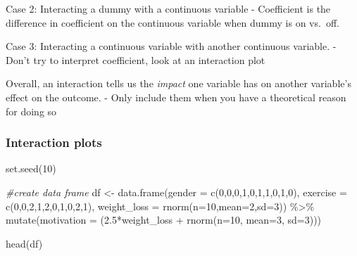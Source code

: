 \documentclass[
]{article}
\newenvironment{Shaded}{\begin{snugshade}}{\end{snugshade}}
\newcommand{\AttributeTok}[1]{\textcolor[rgb]{0.77,0.63,0.00}{#1}}
\newcommand{\CommentTok}[1]{\textcolor[rgb]{0.56,0.35,0.01}{\textit{#1}}}
\newcommand{\DecValTok}[1]{\textcolor[rgb]{0.00,0.00,0.81}{#1}}
\newcommand{\FloatTok}[1]{\textcolor[rgb]{0.00,0.00,0.81}{#1}}
\newcommand{\FunctionTok}[1]{\textcolor[rgb]{0.00,0.00,0.00}{#1}}
\newcommand{\NormalTok}[1]{#1}
\newcommand{\OtherTok}[1]{\textcolor[rgb]{0.56,0.35,0.01}{#1}}
\newcommand{\SpecialCharTok}[1]{\textcolor[rgb]{0.00,0.00,0.00}{#1}}
\begin{document}
Case 2: Interacting a dummy with a continuous variable - Coefficient is
the difference in coefficient on the continuous variable when dummy is
on vs.~off.

Case 3: Interacting a continuous variable with another continuous
variable. - Don't try to interpret coefficient, look at an interaction
plot

Overall, an interaction tells us the \emph{impact} one variable has on
another variable's effect on the outcome. - Only include them when you
have a theoretical reason for doing so

\hypertarget{interaction-plots}{%
\subsubsection{Interaction plots}\label{interaction-plots}}

\begin{Shaded}
\begin{Highlighting}[]
\FunctionTok{set.seed}\NormalTok{(}\DecValTok{10}\NormalTok{)}

\CommentTok{\#create data frame}
\NormalTok{df }\OtherTok{\textless{}{-}} \FunctionTok{data.frame}\NormalTok{(}\AttributeTok{gender =} \FunctionTok{c}\NormalTok{(}\DecValTok{0}\NormalTok{,}\DecValTok{0}\NormalTok{,}\DecValTok{0}\NormalTok{,}\DecValTok{1}\NormalTok{,}\DecValTok{0}\NormalTok{,}\DecValTok{1}\NormalTok{,}\DecValTok{1}\NormalTok{,}\DecValTok{0}\NormalTok{,}\DecValTok{1}\NormalTok{,}\DecValTok{0}\NormalTok{),}
                 \AttributeTok{exercise =} \FunctionTok{c}\NormalTok{(}\DecValTok{0}\NormalTok{,}\DecValTok{0}\NormalTok{,}\DecValTok{2}\NormalTok{,}\DecValTok{1}\NormalTok{,}\DecValTok{2}\NormalTok{,}\DecValTok{0}\NormalTok{,}\DecValTok{1}\NormalTok{,}\DecValTok{0}\NormalTok{,}\DecValTok{2}\NormalTok{,}\DecValTok{1}\NormalTok{),}
                 \AttributeTok{weight\_loss =} \FunctionTok{rnorm}\NormalTok{(}\AttributeTok{n=}\DecValTok{10}\NormalTok{,}\AttributeTok{mean=}\DecValTok{2}\NormalTok{,}\AttributeTok{sd=}\DecValTok{3}\NormalTok{)) }\SpecialCharTok{\%\textgreater{}\%} 
  \FunctionTok{mutate}\NormalTok{(}\AttributeTok{motivation =}\NormalTok{ (}\FloatTok{2.5}\SpecialCharTok{*}\NormalTok{weight\_loss }\SpecialCharTok{+} \FunctionTok{rnorm}\NormalTok{(}\AttributeTok{n=}\DecValTok{10}\NormalTok{, }\AttributeTok{mean=}\DecValTok{3}\NormalTok{, }\AttributeTok{sd=}\DecValTok{3}\NormalTok{)))}
  
\FunctionTok{head}\NormalTok{(df)}
\end{Highlighting}
\end{Shaded}
\end{document}

